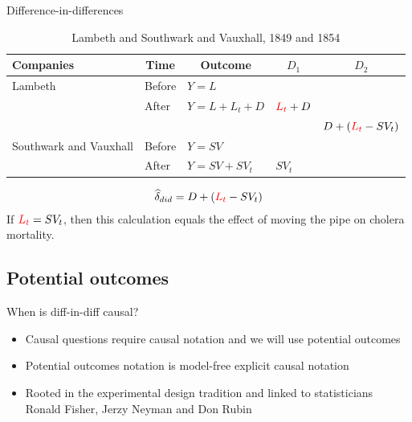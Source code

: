 \documentclass{beamer}
\begin{document}
\begin{frame}{Difference-in-differences}

\begin{table}\centering
\scriptsize
		\caption{Lambeth and Southwark and Vauxhall, 1849 and 1854}
		\begin{center}
		\begin{tabular}{lll|lc}
		\toprule
		\multicolumn{1}{l}{\textbf{Companies}}&
		\multicolumn{1}{c}{\textbf{Time}}&
		\multicolumn{1}{c}{\textbf{Outcome}}&
		\multicolumn{1}{c}{$D_1$}&
		\multicolumn{1}{c}{$D_2$}\\
		\midrule
		Lambeth & Before & $Y=L$ \\
		& After & $Y=L + L_t + D$ & $\textcolor{red}{L_t}+D$\\
		\midrule
		& & & & $D + (\textcolor{red}{L_t}- SV_t)$ \\
		\midrule
		Southwark and Vauxhall & Before & $Y=SV$ \\
		& After & $Y=SV + SV_t$ & $SV_t$\\
		\bottomrule
		\end{tabular}
		\end{center}
	\end{table}

\begin{eqnarray*}
\widehat{\delta}_{did} = D + (\textcolor{red}{L_t}- SV_t)
\end{eqnarray*}If $\textcolor{red}{L_t}=SV_t$, then this calculation equals the effect of moving the pipe on cholera mortality.

\end{frame}







\subsection{Potential outcomes}



\begin{frame}{When is diff-in-diff causal?}

\begin{itemize}
\item Causal questions require causal notation and we will use potential outcomes
\item Potential outcomes notation is model-free explicit causal notation 
\item Rooted in the experimental design tradition and linked to statisticians Ronald Fisher, Jerzy Neyman and Don Rubin
\end{itemize}

\end{frame}
\end{document}
